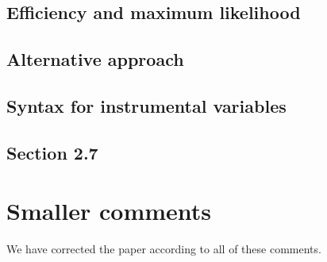 \documentclass[12pt,english]{scrartcl}
\begin{document}
\subsection{Efficiency and maximum likelihood}
% 

\subsection{Alternative approach}

\subsection{Syntax for instrumental variables}

\subsection{Section 2.7}

\section{Smaller comments}
We have corrected the paper according to all of these comments.

% 
% 
\end{document}

